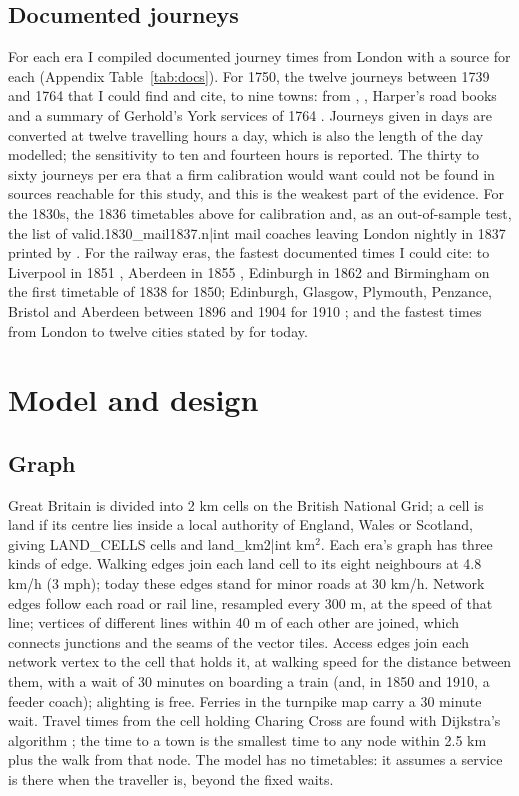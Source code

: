 \subsection{Documented journeys}
For each era I compiled documented journey times from London with a source for each (Appendix Table~\ref{tab:docs}). For 1750, the twelve journeys between 1739 and 1764 that I could find and cite, to nine towns: from \citet{smiles1867}, \citet{bogart2005}, Harper's road books and a summary of Gerhold's York services of 1764 \citep{gnrsite}. Journeys given in days are converted at twelve travelling hours a day, which is also the length of the day modelled; the sensitivity to ten and fourteen hours is reported. The thirty to sixty journeys per era that a firm calibration would want could not be found in sources reachable for this study, and this is the weakest part of the evidence. For the 1830s, the 1836 timetables above for calibration and, as an out-of-sample test, the list of {{valid.1830_mail1837.n|int}} mail coaches leaving London nightly in 1837 printed by \citet{harper1903}. For the railway eras, the fastest documented times I could cite: to Liverpool in 1851 \citep{sidney1851}, Aberdeen in 1855 \citep{wiki_race}, Edinburgh in 1862 \citep{wiki_fs} and Birmingham on the first timetable of 1838 \citep{tring} for 1850; Edinburgh, Glasgow, Plymouth, Penzance, Bristol and Aberdeen between 1896 and 1904 for 1910 \citep{wiki_fs,harper1903,wiki_cre,wiki_cornishman,wiki_race}; and the fastest times from London to twelve cities stated by \citet{visitlondon} for today.

\section{Model and design}\label{sec:model}
\subsection{Graph}
Great Britain is divided into 2 km cells on the British National Grid; a cell is land if its centre lies inside a local authority of England, Wales or Scotland, giving {{LAND_CELLS}} cells and {{land_km2|int}} km$^2$. Each era's graph has three kinds of edge. Walking edges join each land cell to its eight neighbours at 4.8 km/h (3 mph); today these edges stand for minor roads at 30 km/h. Network edges follow each road or rail line, resampled every 300 m, at the speed of that line; vertices of different lines within 40 m of each other are joined, which connects junctions and the seams of the vector tiles. Access edges join each network vertex to the cell that holds it, at walking speed for the distance between them, with a wait of 30 minutes on boarding a train (and, in 1850 and 1910, a feeder coach); alighting is free. Ferries in the turnpike map carry a 30 minute wait. Travel times from the cell holding Charing Cross are found with Dijkstra's algorithm \citep{dijkstra1959}; the time to a town is the smallest time to any node within 2.5 km plus the walk from that node. The model has no timetables: it assumes a service is there when the traveller is, beyond the fixed waits.

